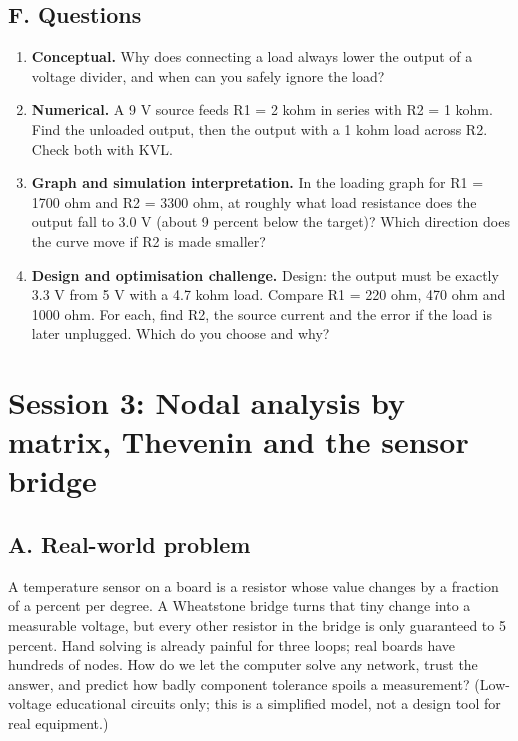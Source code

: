 \documentclass[11pt,a4paper]{article}
\begin{document}
\subsection*{F. Questions}
\begin{enumerate}[nosep]
\item \textbf{Conceptual.} Why does connecting a load always lower the output of a voltage divider, and when can you safely ignore the load?
\item \textbf{Numerical.} A 9 V source feeds R1 = 2 kohm in series with R2 = 1 kohm. Find the unloaded output, then the output with a 1 kohm load across R2. Check both with KVL.
\item \textbf{Graph and simulation interpretation.} In the loading graph for R1 = 1700 ohm and R2 = 3300 ohm, at roughly what load resistance does the output fall to 3.0 V (about 9 percent below the target)? Which direction does the curve move if R2 is made smaller?
\item \textbf{Design and optimisation challenge.} Design: the output must be exactly 3.3 V from 5 V with a 4.7 kohm load. Compare R1 = 220 ohm, 470 ohm and 1000 ohm. For each, find R2, the source current and the error if the load is later unplugged. Which do you choose and why?
\end{enumerate}

\section{Session 3: Nodal analysis by matrix, Thevenin and the sensor bridge}

\subsection*{A. Real-world problem}
A temperature sensor on a board is a resistor whose value changes by a fraction of a percent per degree. A Wheatstone bridge turns that tiny change into a measurable voltage, but every other resistor in the bridge is only guaranteed to 5 percent. Hand solving is already painful for three loops; real boards have hundreds of nodes. How do we let the computer solve any network, trust the answer, and predict how badly component tolerance spoils a measurement? (Low-voltage educational circuits only; this is a simplified model, not a design tool for real equipment.)
\end{document}
